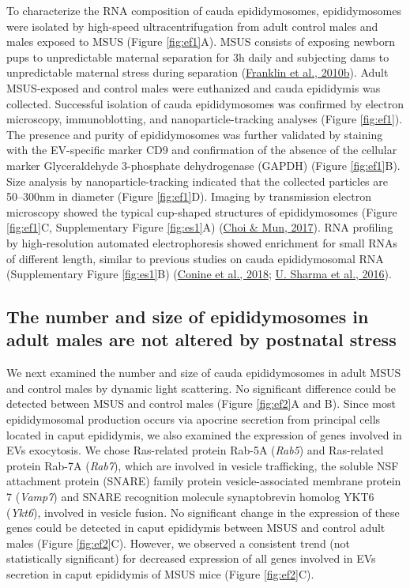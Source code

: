 \documentclass[12pt,twoside]{reedthesis}
\begin{document}
To characterize the RNA composition of cauda epididymosomes,
epididymosomes were isolated by high-speed ultracentrifugation from
adult control males and males exposed to MSUS (Figure \ref{fig:ef1}A). MSUS
consists of exposing newborn pups to unpredictable maternal separation
for 3h daily and subjecting dams to unpredictable maternal stress during
separation (\protect\hyperlink{ref-franklin_2010}{Franklin et al., 2010b}). Adult MSUS-exposed and control males were
euthanized and cauda epididymis was collected. Successful isolation of
cauda epididymosomes was confirmed by electron microscopy,
immunoblotting, and nanoparticle-tracking analyses (Figure \ref{fig:ef1}). The
presence and purity of epididymosomes was further validated by staining
with the EV-specific marker CD9 and confirmation of the absence of the
cellular marker Glyceraldehyde 3-phosphate dehydrogenase (GAPDH)
(Figure \ref{fig:ef1}B). Size analysis by nanoparticle-tracking indicated that the
collected particles are 50--300nm in diameter (Figure \ref{fig:ef1}D). Imaging by
transmission electron microscopy showed the typical cup-shaped
structures of epididymosomes (Figure \ref{fig:ef1}C, Supplementary Figure \ref{fig:es1}A)
(\protect\hyperlink{ref-choi_2017}{Choi \& Mun, 2017}). RNA profiling by high-resolution automated electrophoresis
showed enrichment for small RNAs of different length, similar to
previous studies on cauda epididymosomal RNA (Supplementary Figure \ref{fig:es1}B) (\protect\hyperlink{ref-conine_2018}{Conine et al., 2018}; \protect\hyperlink{ref-sharma_2016}{U. Sharma et al., 2016}).

\hypertarget{the-number-and-size-of-epididymosomes-in-adult-males-are-not-altered-by-postnatal-stress}{%
\subsection{The number and size of epididymosomes in adult males are not altered by postnatal stress}\label{the-number-and-size-of-epididymosomes-in-adult-males-are-not-altered-by-postnatal-stress}}

We next examined the number and size of cauda epididymosomes in adult
MSUS and control males by dynamic light scattering. No significant
difference could be detected between MSUS and control males (Figure \ref{fig:ef2}A
and B). Since most epididymosomal production occurs via apocrine
secretion from principal cells located in caput epididymis, we also
examined the expression of genes involved in EVs exocytosis. We chose
Ras-related protein Rab-5A (\emph{Rab5}) and Ras-related protein Rab-7A
(\emph{Rab7}), which are involved in vesicle trafficking, the soluble NSF
attachment protein (SNARE) family protein vesicle-associated membrane
protein 7 (\emph{Vamp7}) and SNARE recognition molecule synaptobrevin homolog
YKT6 (\emph{Ykt6}), involved in vesicle fusion. No significant change in the
expression of these genes could be detected in caput epididymis between
MSUS and control adult males (Figure \ref{fig:ef2}C). However, we observed a
consistent trend (not statistically significant) for decreased
expression of all genes involved in EVs secretion in caput epididymis of
MSUS mice (Figure \ref{fig:ef2}C).
\end{document}
